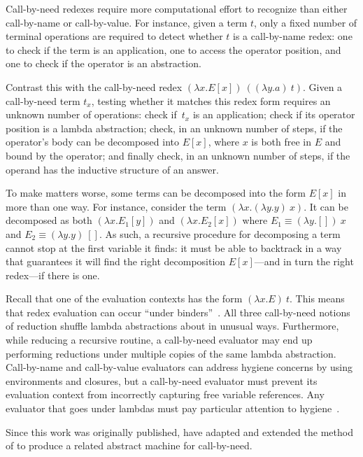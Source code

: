 \documentclass{LMCS}
\theoremstyle{plain}
\theoremstyle{remark}
\begin{document}
Call-by-need redexes require more computational effort to
recognize than either call-by-name or call-by-value.  For instance, given a
term $t$, only a fixed number of terminal operations are required to detect
whether $t$ is a call-by-name redex: one to check if the term is an
application, one to access the operator position, and one to check if the
operator is an abstraction.

Contrast this with the call-by-need redex $(\lambda x.E[x])\:((\lambda
y.a)\:t)$.  Given a call-by-need term $t_x$, testing whether it matches this
redex form requires an unknown number of operations: check if~$t_x$ is an
application; check if its operator position is a lambda abstraction; check, in
an unknown number of steps, if the operator's body can be decomposed into
$E[x]$, where $x$ is both free in $E$ and bound by the operator; and finally
check, in an unknown number of steps, if the operand has the inductive
structure of an answer.

To make matters worse, some terms can be decomposed into the form $E[x]$ in more
than one way.  For instance, consider the term $(\lambda x.(\lambda y.y)\:x)$.
It can be decomposed as both $(\lambda x.E_1[y])$ and $(\lambda x.E_2[x])$
where $E_1\equiv (\lambda y.[])\:x$ and $E_2\equiv (\lambda y.y)\:[]$. As such,
a recursive procedure for decomposing a term cannot stop at the first variable
it finds: it must be able to backtrack in a way that guarantees it will find
the right decomposition $E[x]$---and in turn the right redex---if there is one.


Recall that one of the evaluation contexts has the form 
$(\lambda x.E)\:t$.  This means that redex evaluation can occur ``under
binders''~\cite{sabry04recursion,kameyama08closing}.
All three call-by-need notions of reduction shuffle lambda abstractions about
in unusual ways.  Furthermore, while reducing a recursive routine, a
call-by-need evaluator may end up performing reductions under multiple copies
of the same lambda abstraction.  Call-by-name and call-by-value evaluators can
address hygiene concerns by using environments and closures, but a call-by-need
evaluator must prevent its evaluation context from incorrectly capturing free
variable references.  Any evaluator that goes under lambdas must pay
particular attention to hygiene~\cite{xi97underlambda}.

Since this work was originally published, \citet{danvy10need} have adapted and
extended the method of \citet{danvyTRrefocusing} to produce a related
abstract machine for call-by-need.
\end{document}
